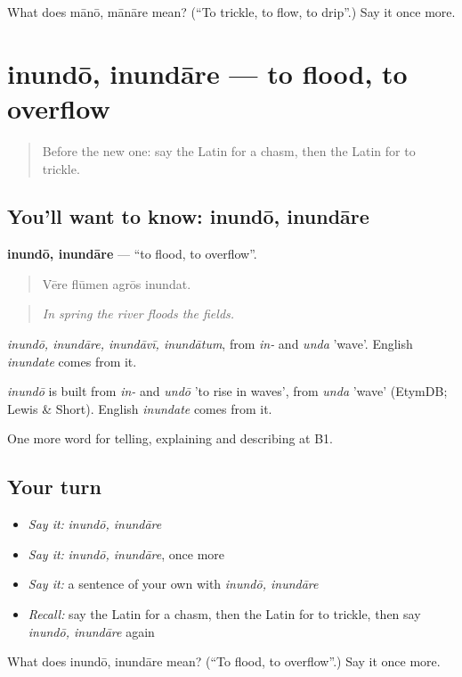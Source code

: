 \begin{tcolorbox}[breakable,colback=teal!4,colframe=teal!35!black,title={Before you move on}]
What does mānō, mānāre mean? (\textquotedblleft{}To trickle, to flow, to drip\textquotedblright{}.) Say it once more.
\end{tcolorbox}
\section[inundō, inundāre]{inundō, inundāre — to flood, to overflow}

\label{lesson:LA-C483-inundo}



\begin{quote}
Before the new one: say the Latin for a chasm, then the Latin for to trickle.
\end{quote}

\subsection*{You'll want to know: inundō, inundāre}
\textbf{inundō, inundāre} — \textquotedblleft{}to flood, to overflow\textquotedblright{}.

\begin{quote}
Vēre flūmen agrōs inundat.
\end{quote}

\begin{quote}
\emph{In spring the river floods the fields.}
\end{quote}

\emph{inundō, inundāre, inundāvī, inundātum}, from \emph{in-} and \emph{unda} 'wave'. English \emph{inundate} comes from it.

\begin{cousinweb}
\emph{inundō} is built from \emph{in-} and \emph{undō} 'to rise in waves', from \emph{unda} 'wave' (EtymDB; Lewis \& Short). English \emph{inundate} comes from it.
\end{cousinweb}

\begin{grammarlens}[title={What you've built}]
One more word for telling, explaining and describing at B1.
\end{grammarlens}

\subsection*{Your turn}
\begin{itemize}
\raggedright
  \item \emph{Say it:} \emph{inundō, inundāre}
  \item \emph{Say it:} \emph{inundō, inundāre}, once more
  \item \emph{Say it:} a sentence of your own with \emph{inundō, inundāre}
  \item \emph{Recall:} say the Latin for a chasm, then the Latin for to trickle, then say \emph{inundō, inundāre} again
\end{itemize}

\begin{tcolorbox}[breakable,colback=teal!4,colframe=teal!35!black,title={Before you move on}]
What does inundō, inundāre mean? (\textquotedblleft{}To flood, to overflow\textquotedblright{}.) Say it once more.
\end{tcolorbox}
